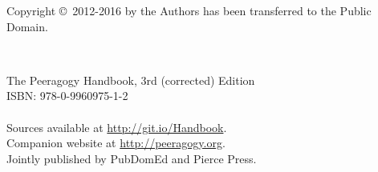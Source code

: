 \documentclass[ebook,12pt, twoside]{memoir}
\newcommand\blankpage{%
    \null
    \thispagestyle{empty}%
    \addtocounter{page}{-1}%
    \newpage}
\begin{document}
\begin{center}
{\large Copyright \copyright\ {2012-2016} by the Authors has been transferred to the Public Domain.\\[.2cm]}
\end{center}
\quad \\[3.5in] 
\begin{center}
\large{The Peeragogy Handbook, 3rd (corrected) Edition\\
ISBN: 978-0-9960975-1-2} %
\quad \\[.2in] 
\quad \\[.2in]
\large{Sources available at \url{http://git.io/Handbook}.\\
Companion website at \url{http://peeragogy.org}.}
\quad \\[.2in]
\large{Jointly published by PubDomEd and Pierce Press.}

\end{center}
\thispagestyle{empty}
\clearpage



\frontmatter

\pagestyle{empty}
\thispagestyle{empty}
\setcounter{page}{-1}
{
\changepage{10mm}{}{}{}{}{-10mm}{}{}{}{}{}{}{}{}
%
\renewcommand{\baselinestretch}{1.2}\normalsize
\tableofcontents*
\renewcommand{\baselinestretch}{1.0}\normalsize
}
\end{document}
